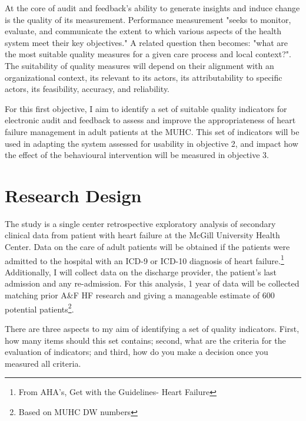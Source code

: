 

At the core of audit and feedback's ability to generate insights and induce change is the quality of its measurement. Performance measurement "seeks to monitor, evaluate, and communicate the extent to which various aspects of the health system meet their key objectives."\cite{smith2009performance} A related question then becomes: "what are the most suitable quality measures for a given care process and local context?". The suitability of quality measures will depend on their alignment with an organizational context, its relevant to its actors, its attributability to specific actors, its feasibility, accuracy, and reliability.\cite{polanczyk2019quality}

For this first objective, I aim to identify a set of suitable quality indicators for electronic audit and feedback to assess and improve the appropriateness of heart failure management in adult patients at the MUHC. This set of indicators will be used in adapting the system assessed for usability in objective 2, and impact how the effect of the behavioural intervention will be measured in objective 3.

\section{Research Design}
The study is a single center retrospective exploratory analysis of secondary clinical data from patient with heart failure at the McGill University Health Center. Data on the care of adult patients will be obtained if the patients were admitted to the hospital with an ICD-9 or ICD-10 diagnosis of heart failure.\footnote{From AHA's, Get with the Guidelines\textcopyright - Heart Failure} Additionally, I will collect data on the discharge provider, the patient's last admission and any re-admission. For this analysis, 1 year of data will be collected matching prior A\&F HF research\cite{kasje2006educational} and giving a manageable estimate of 600 potential patients\footnote{Based on MUHC DW numbers}.

There are three aspects to my aim of identifying a set of quality indicators. First, how many items should this set contains; second, what are the criteria for the evaluation of indicators; and third, how do you make a decision once you measured all criteria.


